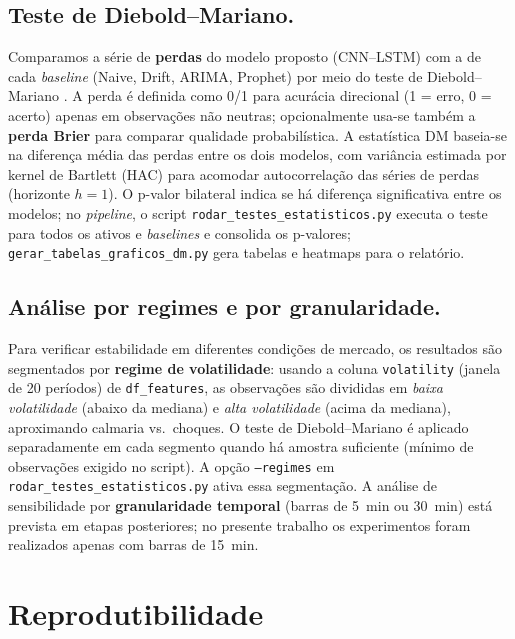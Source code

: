 \subsection{Teste de Diebold--Mariano.} Comparamos a série de \textbf{perdas} do modelo proposto (CNN--LSTM) com a de cada \textit{baseline} (Naive, Drift, ARIMA, Prophet) por meio do teste de Diebold--Mariano \cite{diebold1995}. A perda é definida como 0/1 para acurácia direcional (1 = erro, 0 = acerto) apenas em observações não neutras; opcionalmente usa-se também a \textbf{perda Brier} para comparar qualidade probabilística. A estatística DM baseia-se na diferença média das perdas entre os dois modelos, com variância estimada por kernel de Bartlett (HAC) para acomodar autocorrelação das séries de perdas (horizonte $h=1$). O p-valor bilateral indica se há diferença significativa entre os modelos; no \textit{pipeline}, o script \texttt{rodar\_testes\_estatisticos.py} executa o teste para todos os ativos e \textit{baselines} e consolida os p-valores; \texttt{gerar\_tabelas\_graficos\_dm.py} gera tabelas e heatmaps para o relatório.

\subsection{Análise por regimes e por granularidade.} Para verificar estabilidade em diferentes condições de mercado, os resultados são segmentados por \textbf{regime de volatilidade}: usando a coluna \texttt{volatility} (janela de 20 períodos) de \texttt{df\_features}, as observações são divididas em \emph{baixa volatilidade} (abaixo da mediana) e \emph{alta volatilidade} (acima da mediana), aproximando calmaria vs.\ choques. O teste de Diebold--Mariano é aplicado separadamente em cada segmento quando há amostra suficiente (mínimo de observações exigido no script). A opção \texttt{--regimes} em \texttt{rodar\_testes\_estatisticos.py} ativa essa segmentação. A análise de sensibilidade por \textbf{granularidade temporal} (barras de 5~min ou 30~min) está prevista em etapas posteriores; no presente trabalho os experimentos foram realizados apenas com barras de 15~min.

\section{Reprodutibilidade}
\label{sec:reprodutibilidade}


